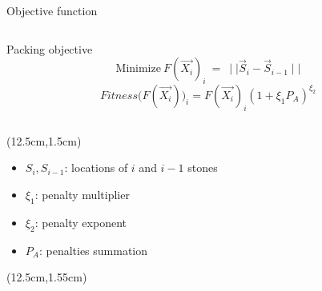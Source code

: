 \documentclass{presentation_template}
\begin{document}
\begin{frame}[t]{Objective function}\vspace{1pt}
\begin{columns}
\begin{column}{0.49\textwidth}
\begin{overprint}
\begin{block}{Packing objective}
    \begin{equation*}
        \text{Minimize}~F(\vec{X_i})_{i}~=~\mid\mid \vec{S}_{i} - \vec{S}_{i-1} \mid\mid
    \end{equation*}
    \begin{equation*}
        Fitness\Big(F(\vec{X_i})\Big)_{i} = F(\vec{X_i})_{i}(1 + \xi_{1} P_A)^{\xi_{2}}
    \end{equation*}
\end{block}
\end{overprint}
\end{column}
\end{columns}
\begin{textblock*}{3.2cm}(12.5cm,1.5cm)
    \tiny{
    \begin{itemize}
        \item $S_{i}, S_{i-1}$: locations of $i$ and $i-1$ stones
        \item $\xi_{1}$: penalty multiplier
        \item $\xi_{2}$: penalty exponent
        \item $P_{A}$: penalties summation
    \end{itemize}
    }
\end{textblock*}
\begin{textblock*}{3cm}(12.5cm,1.55cm)
\end{textblock*}
\end{frame}

\breakingframe{
\begin{textblock*}{10cm}(3.2cm,4cm)
\Huge\textbf{\textcolor{black}{Merci de votre attention}}
\end{textblock*}
}
\end{document}
